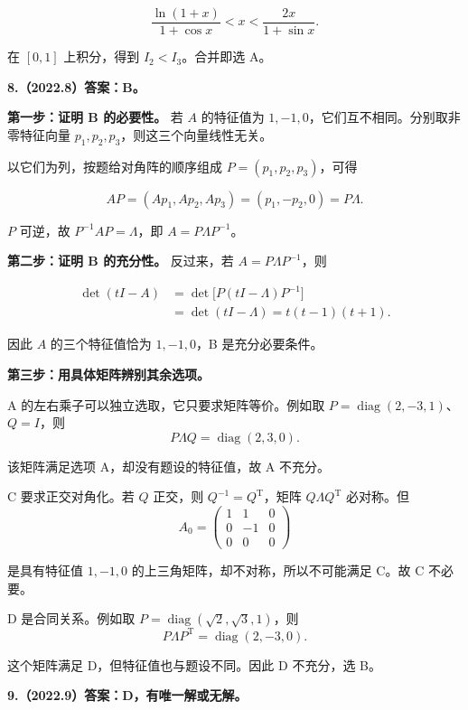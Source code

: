 \documentclass[UTF8,11pt,fontset=windows]{ctexart}
\begin{document}
$$
\frac{\ln(1+x)}{1+\cos x}<x
<\frac{2x}{1+\sin x}.
$$

在 $[0,1]$ 上积分，得到 $I_2<I_3$。合并即选 A。

\clearpage

\textbf{8.（2022.8）答案：B。}

\textbf{第一步：证明 B 的必要性。} 若 $A$ 的特征值为 $1,-1,0$，它们互不相同。分别取非零特征向量 $p_1,p_2,p_3$，则这三个向量线性无关。

以它们为列，按题给对角阵的顺序组成 $P=(p_1,p_2,p_3)$，可得

$$
AP=(Ap_1,Ap_2,Ap_3)=(p_1,-p_2,0)=P\Lambda.
$$

$P$ 可逆，故 $P^{-1}AP=\Lambda$，即 $A=P\Lambda P^{-1}$。

\textbf{第二步：证明 B 的充分性。} 反过来，若 $A=P\Lambda P^{-1}$，则

$$
\begin{aligned}
\det(tI-A)
&=\det\bigl[P(tI-\Lambda)P^{-1}\bigr]\\
&=\det(tI-\Lambda)=t(t-1)(t+1).
\end{aligned}
$$

因此 $A$ 的三个特征值恰为 $1,-1,0$，B 是充分必要条件。

\textbf{第三步：用具体矩阵辨别其余选项。}

A 的左右乘子可以独立选取，它只要求矩阵等价。例如取 $P=\operatorname{diag}(2,-3,1)$、$Q=I$，则
$$
P\Lambda Q=\operatorname{diag}(2,3,0).
$$

该矩阵满足选项 A，却没有题设的特征值，故 A 不充分。

C 要求正交对角化。若 $Q$ 正交，则 $Q^{-1}=Q^{\mathrm T}$，矩阵 $Q\Lambda Q^{\mathrm T}$ 必对称。但
$$
A_0=\begin{pmatrix}1&1&0\\0&-1&0\\0&0&0\end{pmatrix}
$$

是具有特征值 $1,-1,0$ 的上三角矩阵，却不对称，所以不可能满足 C。故 C 不必要。

D 是合同关系。例如取 $P=\operatorname{diag}(\sqrt2,\sqrt3,1)$，则
$$
P\Lambda P^{\mathrm T}=\operatorname{diag}(2,-3,0).
$$

这个矩阵满足 D，但特征值也与题设不同。因此 D 不充分，选 B。

\clearpage

\textbf{9.（2022.9）答案：D，有唯一解或无解。}
\end{document}
